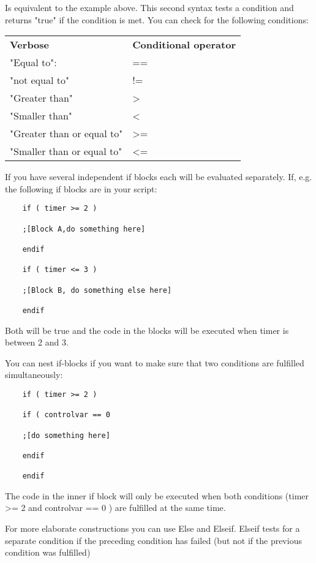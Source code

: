 Is equivalent to the example above. This second syntax tests a condition
and returns "true" if the condition is met. You can check for the
following conditions:

\begin{longtable}[]{@{}
  >{\raggedright\arraybackslash}p{}
  >{\raggedright\arraybackslash}p{}@{}}
\toprule
\endhead
\textbf{Verbose} & \textbf{Conditional operator} \\
"Equal to": & == \\
"not equal to" & != \\
"Greater than" & > \\
"Smaller than" & < \\
"Greater than or equal to" & >= \\
"Smaller than or equal to" & <= \\
\bottomrule
\end{longtable}

If you have several independent if blocks each will be evaluated
separately. If, e.g. the following if blocks are in your script:

\begin{lstlisting}
	if ( timer >= 2 )
	
	;[Block A,do something here]
	
	endif
	
	if ( timer <= 3 )
	
	;[Block B, do something else here]
	
	endif
\end{lstlisting}

Both will be true and the code in the blocks will be executed when timer
is between 2 and 3.

You can nest if-blocks if you want to make sure that two conditions are
fulfilled simultaneously:

\begin{lstlisting}
	if ( timer >= 2 )
	
	if ( controlvar == 0
	
	;[do something here]
	
	endif
	
	endif
\end{lstlisting}

The code in the inner if block will only be executed when both
conditions (timer >= 2 and controlvar == 0 ) are fulfilled at
the same time.

For more elaborate constructions you can use Else and Elseif. Elseif
tests for a separate condition if the preceding condition has failed
(but not if the previous condition was fulfilled)

